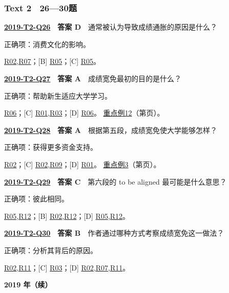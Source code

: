 \documentclass[11pt,a4paper]{article}
\begin{document}
\subsubsection{Text 2　26—30题}
\label{idx-2019-T2-Q26}
\noindent\textbf{\href{https://zj139.github.io/math-notes/english/107ec057655f55ef9ad0ea14/\#q26}{2019-T2-Q26}　答案 D}　通常被认为导致成绩通胀的原因是什么？\par\nopagebreak
\noindent 正确项：消费文化的影响。\par\nopagebreak
\noindent [A] \hyperref[cat-R02]{R02},\hyperref[cat-R07]{R07}；[B] \hyperref[cat-R05]{R05}；[C] \hyperref[cat-R05]{R05}。
\par\smallskip
{}\label{idx-2019-T2-Q27}
\noindent\textbf{\href{https://zj139.github.io/math-notes/english/107ec057655f55ef9ad0ea14/\#q27}{2019-T2-Q27}　答案 A}　成绩宽免最初的目的是什么？\par\nopagebreak
\noindent 正确项：帮助新生适应大学学习。\par\nopagebreak
\noindent [B] \hyperref[cat-R06]{R06}；[C] \hyperref[cat-R01]{R01},\hyperref[cat-R03]{R03}；[D] \hyperref[cat-R06]{R06}。
\hyperref[case-2019-T2-Q27]{重点例12}（第\pageref{case-2019-T2-Q27}页）。
\par\smallskip
{}\label{idx-2019-T2-Q28}
\noindent\textbf{\href{https://zj139.github.io/math-notes/english/107ec057655f55ef9ad0ea14/\#q28}{2019-T2-Q28}　答案 A}　根据第五段，成绩宽免使大学能够怎样？\par\nopagebreak
\noindent 正确项：获得更多资金支持。\par\nopagebreak
\noindent [B] \hyperref[cat-R02]{R02}；[C] \hyperref[cat-R02]{R02},\hyperref[cat-R09]{R09}；[D] \hyperref[cat-R01]{R01}。
\hyperref[case-2019-T2-Q28]{重点例3}（第\pageref{case-2019-T2-Q28}页）。
\par\smallskip
{}\label{idx-2019-T2-Q29}
\noindent\textbf{\href{https://zj139.github.io/math-notes/english/107ec057655f55ef9ad0ea14/\#q29}{2019-T2-Q29}　答案 C}　第六段的 to be aligned 最可能是什么意思？\par\nopagebreak
\noindent 正确项：彼此相同。\par\nopagebreak
\noindent [A] \hyperref[cat-R05]{R05},\hyperref[cat-R12]{R12}；[B] \hyperref[cat-R02]{R02},\hyperref[cat-R12]{R12}；[D] \hyperref[cat-R05]{R05},\hyperref[cat-R12]{R12}。
\par\smallskip
{}\label{idx-2019-T2-Q30}
\noindent\textbf{\href{https://zj139.github.io/math-notes/english/107ec057655f55ef9ad0ea14/\#q30}{2019-T2-Q30}　答案 B}　作者通过哪种方式考察成绩宽免这一做法？\par\nopagebreak
\noindent 正确项：分析其背后的原因。\par\nopagebreak
\noindent [A] \hyperref[cat-R02]{R02},\hyperref[cat-R11]{R11}；[C] \hyperref[cat-R03]{R03}；[D] \hyperref[cat-R02]{R02},\hyperref[cat-R07]{R07},\hyperref[cat-R11]{R11}。
\par\smallskip
\clearpage\noindent\textbf{2019 年（续）}\par
\end{document}
